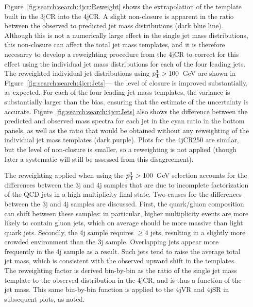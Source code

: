 Figure~\ref{fig:search:search:4jcr:Reweight} shows the extrapolation of the template built in the 3jCR into the 4jCR. A slight non-closure is apparent in the ratio between the observed to predicted jet mass distributions (dark blue line). Although this is not a numerically large effect in the single jet mass distributions, this non-closure can affect the total jet mass templates, and it is therefore necesarry to develop a reweighting procedure from the 4jCR to correct for this effect using the individual jet mass distributions for each of the four leading jets. The reweighted individual jet distributions using $p_{\text{T}}^{3}>100$~GeV are shown in Figure~\ref{fig:search:search:4jcr:Jets}---  the level of closure is improved substantially, as expected. For each of the four leading jet mass templates, the variance is substantially larger than the bias, ensuring that the estimate of the uncertainty is accurate. Figure~\ref{fig:search:search:4jcr:Jets} also shows the difference between the predicted and observed mass spectra for each jet in the cyan ratio in the bottom panels, as well as the ratio that would be obtained without any reweighting of the individual jet mass templates (dark purple). Plots for the 4jCR250 are similar, but the level of non-closure is smaller, so a reweighting is not applied (though later a systematic will still be assessed from this disagreement). %

The reweighting applied when using the $p_{\text{T}}^{3}>100$~GeV selection accounts for the differences between the 3j and 4j samples that are due to incomplete factorization of the QCD jets in a high multiplicity final state. Two causes for the differences between the 3j and 4j samples are discussed. First, the quark/gluon composition can shift between these samples: in particular, higher multiplicity events are more likely to contain gluon jets, which on average should be more massive than light quark jets. Secondly, the 4j sample requires $\geq 4$ jets, resulting in a slightly more crowded environment than the 3j sample. Overlapping jets appear more frequently in the 4j sample as a result. Such jets tend to raise the average total jet mass, which is consistent with the observed upward shift in the templates. The reweighting factor is derived bin-by-bin as the ratio of the single jet mass template to the observed distribution in the 4jCR, and is thus a function of the jet mass. This same bin-by-bin function is applied to the 4jVR and 4jSR in subsequent plots, as noted. 


